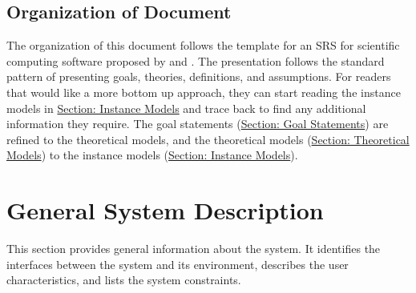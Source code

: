 \documentclass[12pt]{article}
\begin{document}
\subsection{Organization of Document}
\label{Sec:DocOrg}
The organization of this document follows the template for an SRS for scientific computing software proposed by \cite{dParnas1972} and \cite{parnasClements1984}. The presentation follows the standard pattern of presenting goals, theories, definitions, and assumptions. For readers that would like a more bottom up approach, they can start reading the instance models in \hyperref[Sec:IMs]{Section: Instance Models} and trace back to find any additional information they require.
The goal statements (\hyperref[Sec:GoalStmt]{Section: Goal Statements}) are refined to the theoretical models, and the theoretical models (\hyperref[Sec:TMs]{Section: Theoretical Models}) to the instance models (\hyperref[Sec:IMs]{Section: Instance Models}).
\section{General System Description}
\label{Sec:GenSysDesc}
This section provides general information about the system. It identifies the interfaces between the system and its environment, describes the user characteristics, and lists the system constraints.
\end{document}
